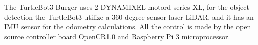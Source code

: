 The TurtleBot3 Burger uses 2 DYNAMIXEL motord series XL, for the object detection the TurtleBot3 utilize a 360 degree sensor laser LiDAR, and it has an IMU sensor for the odometry calculations.
All the control is made by the open source controller board OpenCR1.0 and Raspberry Pi 3 microprocessor.



